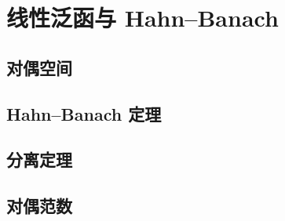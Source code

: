 \section{线性泛函与 Hahn–Banach}
\label{b1:sec:0802}


\subsection{对偶空间}
\label{b1:subsec:080201}

\subsection{Hahn–Banach 定理}
\label{b1:subsec:080202}

\subsection{分离定理}
\label{b1:subsec:080203}

\subsection{对偶范数}
\label{b1:subsec:080204}


